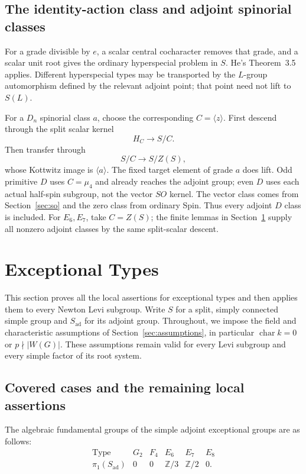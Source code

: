 \documentclass[11pt,a4paper]{article}
\theoremstyle{definition}
\theoremstyle{remark}
\begin{document}
\subsection{The identity-action class and adjoint spinorial classes}
For a grade divisible by \(e\), a scalar central cocharacter removes
that grade, and a scalar unit root gives the ordinary hyperspecial
problem in \(S\). He's Theorem~3.5 applies.
Different hyperspecial types may be transported by the \(L\)-group
automorphism defined by the relevant adjoint point; that point need
not lift to \(S(L)\).

For a \(D_n\) spinorial class \(a\), choose the corresponding
\(C=\langle z\rangle\).
First descend through the split scalar kernel
\[
H_C\longrightarrow S/C.
\]
Then transfer through
\[
S/C\longrightarrow S/Z(S),
\]
whose Kottwitz image is \(\langle a\rangle\).
The fixed target element of grade \(a\) does lift.
Odd primitive \(D\) uses \(C=\mu_4\) and already reaches the
adjoint group; even \(D\) uses each actual half-spin subgroup,
not the vector \(SO\) kernel.
The vector class comes from Section~\ref{sec:so} and the zero
class from ordinary Spin. Thus every adjoint \(D\) class is included.
For \(E_6,E_7\), take \(C=Z(S)\); the finite lemmas in
Section~\ref{sec:exceptional} supply all nonzero adjoint classes by
the same split-scalar descent.

\section{Exceptional Types}\label{sec:exceptional}

This section proves all the local assertions for exceptional types and then
applies them to every Newton Levi subgroup. Write \(S\) for a split, simply
connected simple group and \(S_{\mathrm{ad}}\) for its adjoint group.
Throughout, we impose the field and characteristic assumptions of
Section~\ref{sec:assumptions}, in particular
\(\operatorname{char}k=0\) or \(p\nmid |W(G)|\).
These assumptions remain valid for every Levi subgroup and every simple
factor of its root system.

\subsection{Covered cases and the remaining local assertions}
\label{subsec:ex-remaining}

The algebraic fundamental groups of the simple adjoint exceptional groups
are as follows:
\begin{equation}\label{eq:ex-fundamental-groups}
\begin{array}{c|ccccc}
\text{Type}&G_2&F_4&E_6&E_7&E_8\\ \hline
\pi_1(S_{\mathrm{ad}})&0&0&\mathbb Z/3&\mathbb Z/2&0.
\end{array}
\end{equation}
\end{document}

